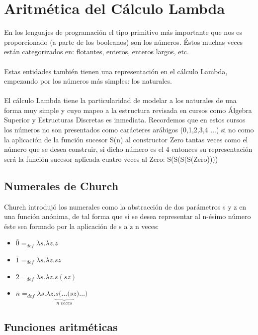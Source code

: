      \section{Aritmética del Cálculo Lambda}
        En los lenguajes de programación el tipo primitivo más importante que nos es proporcionado (a parte de los booleanos) son los números. Éstos muchas veces están categorizados en: flotantes, enteros, enteros largos, etc.\\\\
        Estas entidades también tienen una representación en el cálculo Lambda, empezando por los números más simples: los naturales.\\\\
        El cálculo Lambda tiene la particularidad de modelar a los naturales de una forma muy simple y cuyo mapeo a la estructura revisada en cursos como Álgebra Superior y Estructuras Discretas es inmediata. Recordemos que en estos cursos los números no son presentados como carácteres arábigos (0,1,2,3,4 ...) si no como la aplicación de la función sucesor S(n) al constructor Zero tantas veces como el número que se desea construir, si dicho número es el 4 entonces su representación será la función sucesor aplicada cuatro veces al Zero: S(S(S(S(Zero))))
        
     \subsection{Numerales de Church}
        Church introdujó los numerales como la abstracción de dos parámetros s y z en una función anónima, de tal forma que si se desea representar al n-ésimo número éste sea formado por la aplicación de s a z n veces:

    \begin{itemize}
        \item $\bar{0}=_{def}\lambda s.\lambda z.z$
        \item $\bar{1}=_{def}\lambda s.\lambda z.sz$
        \item $\bar{2}=_{def}\lambda s.\lambda z.s(sz)$
        \item $\bar{n}=_{def}\lambda s.\lambda z.\underbrace{s(\ldots(s}_{n\;veces} z)\ldots)$
    \end{itemize}

    \subsection{Funciones aritméticas}

